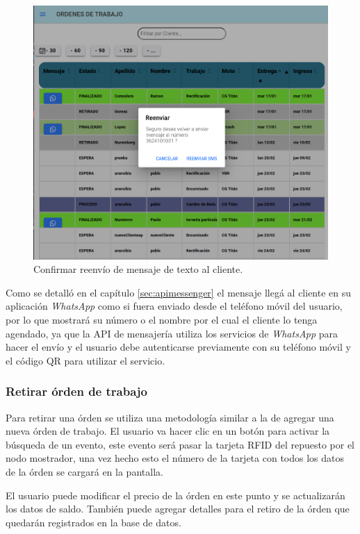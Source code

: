 \begin{figure}[H]
	\centering
	\includegraphics[scale=.30]{./Figures/listado-3.png}
	\caption{Confirmar reenvío de mensaje de texto al cliente.}
	\label{fig:listado3}
\end{figure}

Como se detalló en el capítulo \ref{sec:apimessenger} el mensaje llegá al cliente en su aplicación \textit{WhatsApp} como si fuera enviado desde el teléfono móvil del usuario, por lo que mostrará su número o el nombre por el cual el cliente lo tenga agendado, ya que la API de mensajería utiliza los servicios de \textit{WhatsApp} para hacer el envío y el usuario debe autenticarse previamente con su teléfono móvil y el código QR para utilizar el servicio.

\subsubsection{Retirar órden de trabajo}
\label{subsubsec:frontretirar}

Para retirar una órden se utiliza una metodología similar a la de agregar una nueva órden de trabajo. El usuario va hacer clic en un botón para activar la búsqueda de un evento, este evento será pasar la tarjeta RFID del repuesto por el nodo mostrador, una vez hecho esto el número de la tarjeta con todos los datos de la órden se cargará en la pantalla. 

El usuario puede modificar el precio de la órden en este punto y se actualizarán los datos de saldo. También puede agregar detalles para el retiro de la órden que quedarán registrados en la base de datos.

